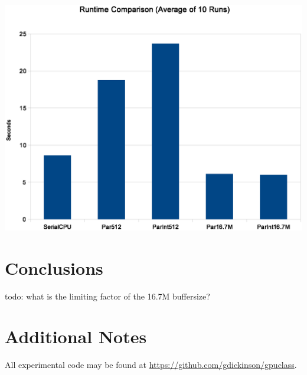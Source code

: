 \documentclass[twocolumn]{article}
\begin{document}
  \includegraphics[scale=0.25]{gpuruntimes.eps} 

  \section{Conclusions}
   todo: what is the limiting factor of the 16.7M buffersize?

  \section{Additional Notes}
  All experimental code may be found at \url{https://github.com/gdickinson/gpuclass}.
  
  {}
  
  
\end{document}
